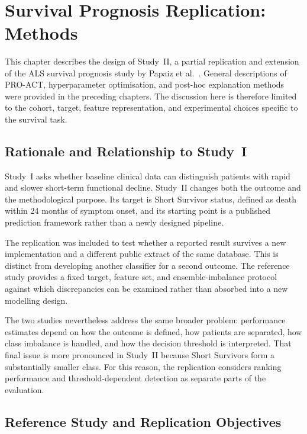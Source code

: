 ﻿﻿\chapter{Survival Prognosis Replication: Methods}
\label{ch:study2_methods}

This chapter describes the design of Study~II, a partial replication and extension of the ALS survival prognosis study by Papaiz et al.~\cite{Papaiz2024}.
General descriptions of \gls{PRO-ACT}, hyperparameter optimisation, and post-hoc explanation methods were provided in the preceding chapters.
The discussion here is therefore limited to the cohort, target, feature representation, and experimental choices specific to the survival task.

\section{Rationale and Relationship to Study~I}
\label{sec:s2_rationale}

Study~I asks whether baseline clinical data can distinguish patients with rapid and slower short-term functional decline.
Study~II changes both the outcome and the methodological purpose.
Its target is Short Survivor status, defined as death within 24 months of symptom onset, and its starting point is a published prediction framework rather than a newly designed pipeline.

The replication was included to test whether a reported result survives a new implementation and a different public extract of the same database.
This is distinct from developing another classifier for a second outcome.
The reference study provides a fixed target, feature set, and ensemble-imbalance protocol against which discrepancies can be examined rather than absorbed into a new modelling design.

The two studies nevertheless address the same broader problem: performance estimates depend on how the outcome is defined, how patients are separated, how class imbalance is handled, and how the decision threshold is interpreted.
That final issue is more pronounced in Study~II because Short Survivors form a substantially smaller class.
For this reason, the replication considers ranking performance and threshold-dependent detection as separate parts of the evaluation.

\section{Reference Study and Replication Objectives}
\label{sec:s2_reference}

